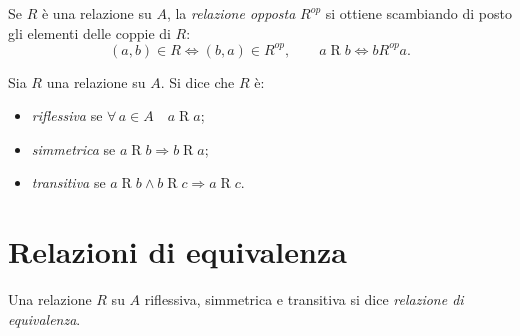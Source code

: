 \documentclass[11pt,a4paper]{article}
\begin{document}
\begin{definizione}
Se $R$ è una relazione su $A$, la \emph{relazione opposta} $R^{op}$ si
ottiene scambiando di posto gli elementi delle coppie di $R$:
\[
(a, b) \in R \iff (b, a) \in R^{op}, \qquad
a \mathrel{R} b \iff b \mathrel{R^{op}} a.
\]
\end{definizione}

\begin{definizione}
Sia $R$ una relazione su $A$. Si dice che $R$ è:
\begin{itemize}
    \item \emph{riflessiva} se $\forall\, a \in A \quad a \mathrel{R} a$;
    \item \emph{simmetrica} se $a \mathrel{R} b \Rightarrow
          b \mathrel{R} a$;
    \item \emph{transitiva} se $a \mathrel{R} b \land b \mathrel{R} c
          \Rightarrow a \mathrel{R} c$.
\end{itemize}
\end{definizione}

\section{Relazioni di equivalenza}

\begin{definizione}
Una relazione $R$ su $A$ riflessiva, simmetrica e transitiva si dice
\emph{relazione di equivalenza}.
\end{definizione}
\end{document}
